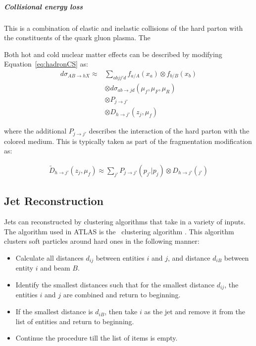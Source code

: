\subparagraph{Collisional energy loss} This is a combination of elastic and inelastic collisions of the hard parton with the constituents of the quark gluon plasma. The 

Both hot and cold nuclear matter effects can be described by modifying Equation~\ref{eq:hadronCS} as:
\begin{align}
d \sigma_{AB \rightarrow hX}  \approx & \sum_{abjj'd} f_{a/A} (x_a) \otimes f_{b/B} (x_b) \\ 
& \otimes d\sigma_{ab\rightarrow jd} (\mu_f, \mu_F, \mu_R)  \nonumber \\
& \otimes P_{j\rightarrow j'} \nonumber \\
& \otimes D_{h \rightarrow j'} (z_j, \mu_f) \nonumber 
\end{align}

where the additional $P_{j\rightarrow j'}$ describes the interaction of the hard parton with the colored medium. This is typically taken as part of the fragmentation modification as:

\begin{align}
\widetilde{D}_{h \rightarrow j'} (z_j, \mu_f) \approx \sum_{j'} P_{j\rightarrow j'} (p_{j'} | p_j) \otimes D_{h\rightarrow j'} (_{j'})
\end{align}


\subsection{Jet Reconstruction}
Jets can reconstructed by clustering algorithms that take in a variety of inputs. The algorithm used in ATLAS is the \antikt\ clustering algorithm \cite{Cacciari:2008gp}. This algorithm clusters soft particles around hard ones in the following manner:

\begin{itemize}
\item Calculate all distances $d_{ij}$ between entities $i$ and $j$, and distance $d_{iB}$ between entity $i$ and beam $B$.
\item Identify the smallest distances such that for the smallest distance $d_{ij}$, the entities $i$ and $j$ are combined and return to beginning.
\item If the smallest distance is $d_{iB}$, then take $i$ as the jet and remove it from the list of entities and return to beginning.
\item Continue the procedure till the list of items is empty.
\end{itemize}

